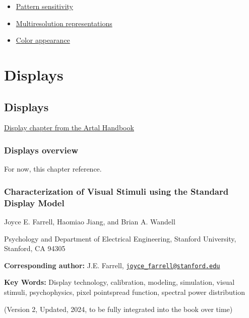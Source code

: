 \documentclass[
  letterpaper,
]{book}
\providecommand{\tightlist}{%
  \setlength{\itemsep}{0pt}\setlength{\parskip}{0pt}}\usepackage{longtable,booktabs,array}
\begin{document}
\begin{itemize}
\tightlist
\item
  \href{https://wandell.github.io/FOV-1995/chapter-7-pattern-sensitivity.html}{Pattern
  sensitivity}
\item
  \href{https://wandell.github.io/FOV-1995/chapter-8-multiresolution-image-representations.html}{Multiresolution
  representations}
\item
  \href{https://wandell.github.io/FOV-1995/chapter-9-color.html}{Color
  appearance}
\end{itemize}

\part{Displays}

\chapter{Displays}\label{sec-displays}

\href{resources/characterizing-artal.qmd}{Display chapter from the Artal
Handbook}

\section{Displays overview}\label{sec-displays-overview}

For now, this chapter reference.

\section{Characterization of Visual Stimuli using the Standard Display
Model}\label{characterization-of-visual-stimuli-using-the-standard-display-model}

Joyce E. Farrell, Haomiao Jiang, and Brian A. Wandell

Psychology and Department of Electrical Engineering, Stanford
University, Stanford, CA 94305

\textbf{Corresponding author:} J.E. Farrell,
\href{mailto:joyce_farrell@stanford.edu}{\nolinkurl{joyce\_farrell@stanford.edu}}

\textbf{Key Words:} Display technology, calibration, modeling,
simulation, visual stimuli, psychophysics, pixel pointspread function,
spectral power distribution

(Version 2, Updated, 2024, to be fully integrated into the book over
time)
\end{document}
